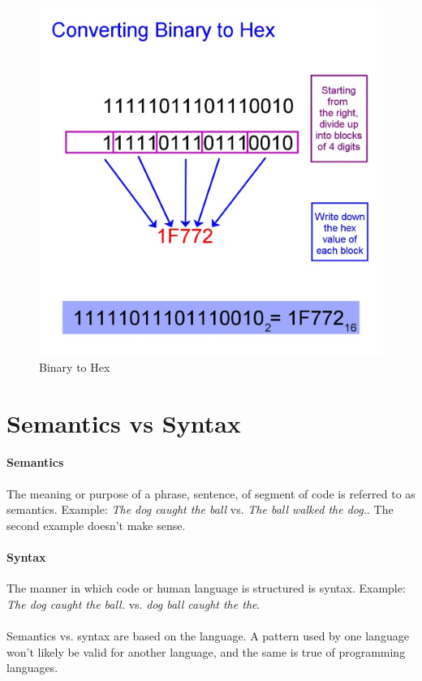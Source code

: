 \documentclass[letter,11pt]{article}
\begin{document}
\begin{figure}[h!]
    \centering
    \includegraphics[scale=0.31]{FinalExam/bin_hex.jpg}
    \caption{Binary to Hex}
    \label{fig:binhexfig}
\end{figure}
\FloatBarrier

\section{Semantics vs Syntax}
\paragraph{Semantics} The meaning or purpose of a phrase, sentence, of segment of code is referred to as semantics. Example: \textit{The dog caught the ball} vs. \textit{The ball walked the dog.}. The second example doesn't make sense.

\paragraph{Syntax} The manner in which code or human language is structured is syntax. Example: \textit{The dog caught the ball.} vs. \textit{dog ball caught the the}.

\paragraph{}Semantics vs. syntax are based on the language. A pattern used by one language won't likely be valid for another language, and the same is true of programming languages.
\end{document}
